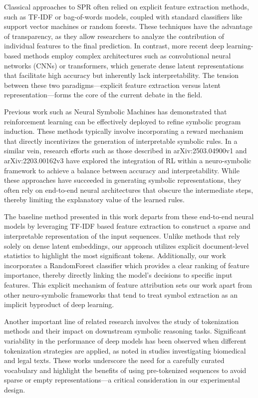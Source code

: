 \documentclass{article}
\begin{document}
Classical approaches to SPR often relied on explicit feature extraction methods, such as TF-IDF or bag-of-words models, coupled with standard classifiers like support vector machines or random forests. These techniques have the advantage of transparency, as they allow researchers to analyze the contribution of individual features to the final prediction. In contrast, more recent deep learning-based methods employ complex architectures such as convolutional neural networks (CNNs) or transformers, which generate dense latent representations that facilitate high accuracy but inherently lack interpretability. The tension between these two paradigms—explicit feature extraction versus latent representation—forms the core of the current debate in the field.

Previous work such as Neural Symbolic Machines has demonstrated that reinforcement learning can be effectively deployed to refine symbolic program induction. These methods typically involve incorporating a reward mechanism that directly incentivizes the generation of interpretable symbolic rules. In a similar vein, research efforts such as those described in arXiv:2503.04900v1 and arXiv:2203.00162v3 have explored the integration of RL within a neuro-symbolic framework to achieve a balance between accuracy and interpretability. While these approaches have succeeded in generating symbolic representations, they often rely on end-to-end neural architectures that obscure the intermediate steps, thereby limiting the explanatory value of the learned rules.

The baseline method presented in this work departs from these end-to-end neural models by leveraging TF-IDF based feature extraction to construct a sparse and interpretable representation of the input sequences. Unlike methods that rely solely on dense latent embeddings, our approach utilizes explicit document-level statistics to highlight the most significant tokens. Additionally, our work incorporates a RandomForest classifier which provides a clear ranking of feature importance, thereby directly linking the model’s decisions to specific input features. This explicit mechanism of feature attribution sets our work apart from other neuro-symbolic frameworks that tend to treat symbol extraction as an implicit byproduct of deep learning.

Another important line of related research involves the study of tokenization methods and their impact on downstream symbolic reasoning tasks. Significant variability in the performance of deep models has been observed when different tokenization strategies are applied, as noted in studies investigating biomedical and legal texts. These works underscore the need for a carefully curated vocabulary and highlight the benefits of using pre-tokenized sequences to avoid sparse or empty representations—a critical consideration in our experimental design.
\end{document}
